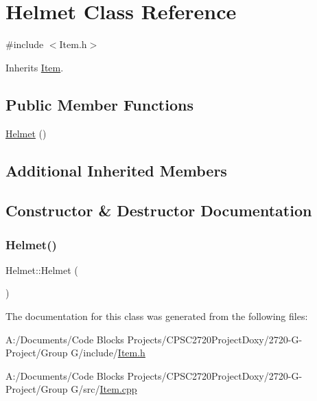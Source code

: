 \hypertarget{class_helmet}{}\section{Helmet Class Reference}
\label{class_helmet}


{\ttfamily \#include $<$Item.\+h$>$}



Inherits \mbox{\hyperlink{class_item}{Item}}.

\subsection*{Public Member Functions}
\begin{DoxyCompactItemize}
\item 
\mbox{\hyperlink{class_helmet_ae9f39c8ca82962c770f9907123e663f5}{Helmet}} ()
\end{DoxyCompactItemize}
\subsection*{Additional Inherited Members}


\subsection{Constructor \& Destructor Documentation}
\mbox{\label{class_helmet_ae9f39c8ca82962c770f9907123e663f5}} 
\subsubsection{\texorpdfstring{Helmet()}{Helmet()}}
{\footnotesize\ttfamily Helmet\+::\+Helmet (\begin{DoxyParamCaption}{ }\end{DoxyParamCaption})}



The documentation for this class was generated from the following files\+:\begin{DoxyCompactItemize}
\item 
A\+:/\+Documents/\+Code Blocks Projects/\+C\+P\+S\+C2720\+Project\+Doxy/2720-\/\+G-\/\+Project/\+Group G/include/\mbox{\hyperlink{_item_8h}{Item.\+h}}\item 
A\+:/\+Documents/\+Code Blocks Projects/\+C\+P\+S\+C2720\+Project\+Doxy/2720-\/\+G-\/\+Project/\+Group G/src/\mbox{\hyperlink{_item_8cpp}{Item.\+cpp}}\end{DoxyCompactItemize}
